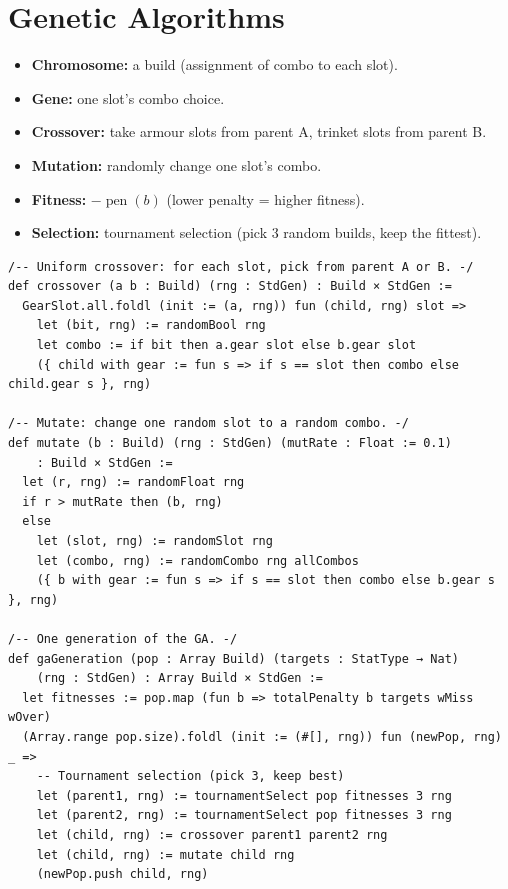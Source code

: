 \documentclass[11pt, a4paper, oneside]{book}
\newcommand{\pen}{\operatorname{pen}}
\begin{document}
\section{Genetic Algorithms}

\begin{defbox}[title={Genetic Algorithm for Gear}]
\begin{itemize}[nosep]
  \item \textbf{Chromosome:} a build (assignment of combo to each slot).
  \item \textbf{Gene:} one slot's combo choice.
  \item \textbf{Crossover:} take armour slots from parent A, trinket slots
    from parent B.
  \item \textbf{Mutation:} randomly change one slot's combo.
  \item \textbf{Fitness:} $-\pen(b)$ (lower penalty = higher fitness).
  \item \textbf{Selection:} tournament selection (pick 3 random builds, keep
    the fittest).
\end{itemize}
\end{defbox}

\begin{leanbox}[title={Lean 4 --- Crossover and Mutation}]
\begin{verbatim}
/-- Uniform crossover: for each slot, pick from parent A or B. -/
def crossover (a b : Build) (rng : StdGen) : Build × StdGen :=
  GearSlot.all.foldl (init := (a, rng)) fun (child, rng) slot =>
    let (bit, rng) := randomBool rng
    let combo := if bit then a.gear slot else b.gear slot
    ({ child with gear := fun s => if s == slot then combo else child.gear s }, rng)

/-- Mutate: change one random slot to a random combo. -/
def mutate (b : Build) (rng : StdGen) (mutRate : Float := 0.1)
    : Build × StdGen :=
  let (r, rng) := randomFloat rng
  if r > mutRate then (b, rng)
  else
    let (slot, rng) := randomSlot rng
    let (combo, rng) := randomCombo rng allCombos
    ({ b with gear := fun s => if s == slot then combo else b.gear s }, rng)

/-- One generation of the GA. -/
def gaGeneration (pop : Array Build) (targets : StatType → Nat)
    (rng : StdGen) : Array Build × StdGen :=
  let fitnesses := pop.map (fun b => totalPenalty b targets wMiss wOver)
  (Array.range pop.size).foldl (init := (#[], rng)) fun (newPop, rng) _ =>
    -- Tournament selection (pick 3, keep best)
    let (parent1, rng) := tournamentSelect pop fitnesses 3 rng
    let (parent2, rng) := tournamentSelect pop fitnesses 3 rng
    let (child, rng) := crossover parent1 parent2 rng
    let (child, rng) := mutate child rng
    (newPop.push child, rng)
\end{verbatim}
\end{leanbox}
\end{document}
